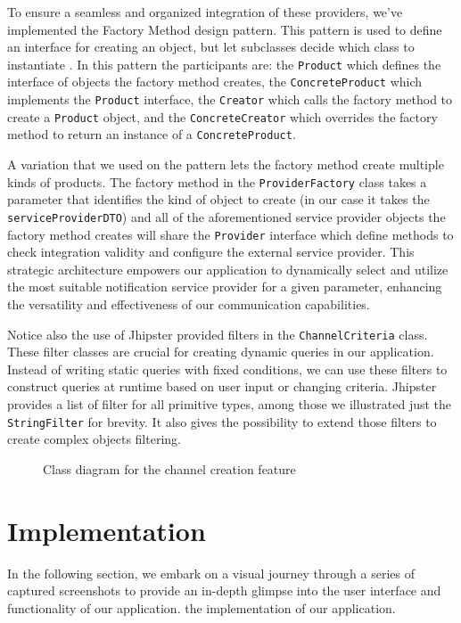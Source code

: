 To ensure a seamless and organized integration of these providers, we've implemented the
Factory Method design pattern. This pattern is used to define an interface for creating an object,
but let subclasses decide which class to instantiate \cite{patterns}. In this pattern the participants are:
the \texttt{Product} which defines the interface of objects the factory method creates, the
\texttt{ConcreteProduct} which implements the \texttt{Product} interface, the \texttt{Creator} which
calls the factory method to create a \texttt{Product} object, and the \texttt{ConcreteCreator} which overrides
the factory method to return an instance of a \texttt{ConcreteProduct}.

A variation that we used on the pattern lets the factory method create multiple kinds of products.
The factory method in the \texttt{ProviderFactory} class takes a parameter that identifies the kind of object
to create (in our case it takes the \texttt{serviceProviderDTO}) and all of the
aforementioned service provider objects the factory method creates will share the \texttt{Provider} interface
which define methods to check integration validity and configure the external service provider.
This strategic architecture empowers our application to dynamically select and utilize the most suitable
notification service provider for a given parameter, enhancing the versatility and effectiveness of
our communication capabilities.

Notice also the use of Jhipster provided filters in the \texttt{ChannelCriteria} class. These filter
classes are crucial for creating dynamic queries in our application. Instead of writing static queries
with fixed conditions, we can use these filters to construct queries at runtime based on user input
or changing criteria. Jhipster provides a list of filter for all primitive types, among those we illustrated
just the \texttt{StringFilter} for brevity. It also gives the possibility to extend those filters
to create complex objects filtering.

\begin{landscape}
    \begin{figure}[hbt!]
        \centering
        
        \caption{Class diagram for the channel creation feature}
        \label{detailed-1}
    \end{figure}
\end{landscape}


\section{Implementation}
In the following section, we embark on a visual journey through a series of captured screenshots to provide
an in-depth glimpse into the user interface and functionality of our application.
the implementation of our application.

